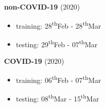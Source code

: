 \documentclass[aspectratio=169]{beamer}
\begin{document}
\begin{frame}
    \frametitle{\secname}
    \framesubtitle{\subsecname}

    \begin{minipage}{0.37\textwidth}
            \textbf{non-COVID-19} (2020)
                \begin{itemize}
                    \item training: 28\textsuperscript{th}Feb - 28\textsuperscript{th}Mar
                    \item testing: 29\textsuperscript{th}Feb - 07\textsuperscript{th}Mar
                \end{itemize}
            \textbf{COVID-19} (2020)
                \begin{itemize}
                    \item training: 06\textsuperscript{th}Feb - 07\textsuperscript{th}Mar
                    \item testing: 08\textsuperscript{th}Mar - 15\textsuperscript{th}Mar
                \end{itemize}
        \vspace{1.5em}
    \end{minipage}
    \hfill
    \begin{minipage}{0.6\textwidth}
    \end{minipage}

\end{frame}
\end{document}
